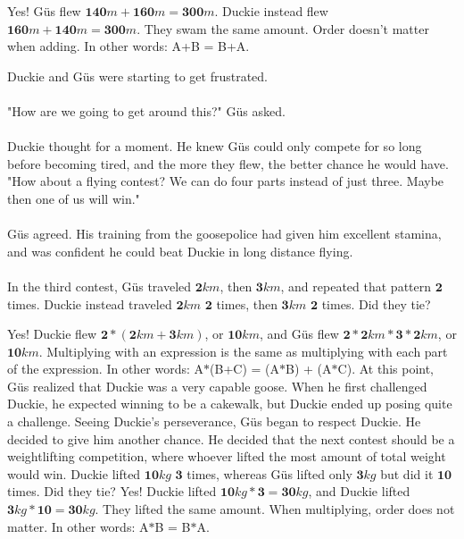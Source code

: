 {Yes! G{\"u}s flew $\mathbf{140} m + \mathbf{160} m = \mathbf{300} m$. Duckie instead flew $\mathbf{160} m + \mathbf{140} m = \mathbf{300} m$. They swam the same amount.}
{Order doesn't matter when adding. In other words: A+B = B+A.}
{}
{Duckie and G{\"u}s were starting to get frustrated. 
\paragraph{} "How are we going to get around this?" G{\"u}s asked.
\paragraph{} Duckie thought for a moment. He knew G{\"u}s could only compete for so long before becoming tired, and the more they flew, the better chance he would have. "How about a flying contest? We can do four parts instead of just three. Maybe then one of us will win."
\paragraph{} G{\"u}s agreed. His training from the goosepolice had given him excellent stamina, and was confident he could beat Duckie in long distance flying. 
\paragraph{} In the third contest, G{\"u}s traveled $\mathbf{2} km$, then $\mathbf{3} km$, and repeated that pattern $\mathbf{2}$ times. Duckie instead traveled $\mathbf{2} km$ $\mathbf{2}$ times, then $\mathbf{3} km$ $\mathbf{2}$ times. Did they tie?}
{Yes! Duckie flew $\mathbf{2}\ast(\mathbf{2} km + \mathbf{3} km)$, or $\mathbf{10} km$, and G{\"u}s flew $\mathbf{2}\ast\mathbf{2} km \ast \mathbf{3}\ast\mathbf{2} km$, or $\mathbf{10}km$.}
{Multiplying with an expression is the same as multiplying with each part of the expression. In other words: A$\ast$(B+C) = (A$\ast$B) + (A$\ast$C).}
{}
{At this point, G{\"u}s realized that Duckie was a very capable goose. When he first challenged Duckie, he expected winning to be a cakewalk, but Duckie ended up posing quite a challenge. Seeing Duckie's perseverance, G{\"u}s began to respect Duckie. He decided to give him another chance. He decided that the next contest should be a weightlifting competition, where whoever lifted the most amount of total weight would win. Duckie lifted $\mathbf{10} kg$  $\mathbf{3}$ times, whereas G{\"u}s lifted only $\mathbf{3} kg$ but did it $\mathbf{10}$ times. Did they tie?}
{Yes! Duckie lifted $\mathbf{10}kg\ast\mathbf{3}=\mathbf{30}kg$, and Duckie lifted $\mathbf{3}kg \ast \mathbf{10}=\mathbf{30}kg$. They lifted the same amount.}
{When multiplying, order does not matter. In other words: A$\ast$B = B$\ast$A.}
{}
